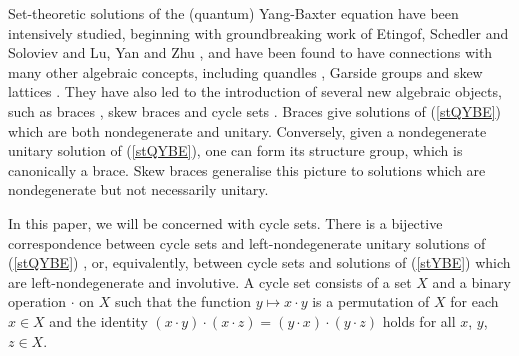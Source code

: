 \documentclass[letterpaper,12pt]{amsart}
\numberwithin{equation}{section}
\numberwithin{algorithm}{section}
\theoremstyle{definition}
\begin{document}
Set-theoretic solutions of the (quantum) Yang-Baxter equation have been intensively studied, beginning with groundbreaking work of Etingof, Schedler and Soloviev \cite{ESS} and Lu, Yan and Zhu \cite{LYZ}, and have been found to have connections with many other algebraic concepts, including quandles \cite{Fenn}, Garside groups \cite{Chouraqui} and skew lattices \cite{CV-V}. They have also led to the introduction of several new algebraic objects, such as braces \cite{Rump07}, skew braces \cite{GV} and cycle sets \cite{Rump05}. Braces give solutions of (\ref{stQYBE}) which are both nondegenerate and unitary. Conversely, given a nondegenerate unitary solution of (\ref{stQYBE}), one can form its structure group, which is canonically a brace. Skew braces generalise this picture to solutions which are nondegenerate but not necessarily unitary. 

In this paper, we will be concerned with cycle sets. 
There is a bijective correspondence between cycle sets and left-nondegenerate unitary solutions of (\ref{stQYBE}) \cite[Proposition 1]{Rump05}, or, equivalently, between cycle sets and solutions of (\ref{stYBE}) which are left-nondegenerate and involutive.
A cycle set consists of a set $X$ and a binary operation $\cdot$ on $X$ such that the function $y \mapsto x \cdot y$ is a permutation of $X$ for each $x \in X$ and the identity $( x \cdot y) \cdot (x \cdot z)  = (y \cdot x) \cdot (y \cdot z)$ holds for all $x$, $y$, $z \in X$.
\end{document}
